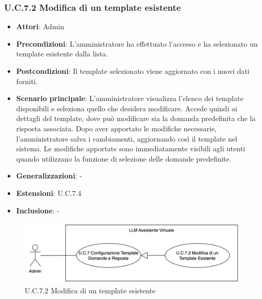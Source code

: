 \subsubsection{U.C.7.2 Modifica di un template esistente}
\begin{itemize}
    \item \textbf{Attori}: Admin
    \item \textbf{Precondizioni}: L'amministratore ha effettuato l'accesso e ha selezionato un template esistente dalla lista.
    \item \textbf{Postcondizioni}: Il template selezionato viene aggiornato con i nuovi dati forniti.
    \item \textbf{Scenario principale}: L'amministratore visualizza l'elenco dei template disponibili e seleziona quello che desidera modificare. Accede quindi ai dettagli del template, dove può modificare sia la domanda predefinita che la risposta associata. Dopo aver apportato le modifiche necessarie, l'amministratore salva i cambiamenti, aggiornando così il template nel sistema. Le modifiche apportate sono immediatamente visibili agli utenti quando utilizzano la funzione di selezione delle domande predefinite. 
    \item \textbf{Generalizzazioni}: -
    \item \textbf{Estensioni}: U.C.7.4
    \item \textbf{Inclusione}: -
\end{itemize}
\begin{figure}[H]
    \centering
    \includegraphics[width=\textwidth]{img/U.C.7.2.png}
    \caption{U.C.7.2 Modifica di un template esistente}
\end{figure}
\newpage

